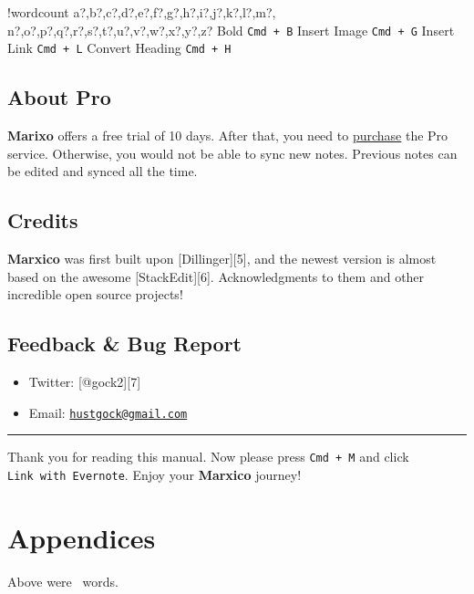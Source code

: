 \documentclass{article}
\providecommand{\tightlist}{%
  \setlength{\itemsep}{0pt}\setlength{\parskip}{0pt}}
\newcounter{words}
\newenvironment{counted}{%
  \setcounter{words}{0}
  \SearchList!{wordcount}{\stepcounter{words}}
    {a?,b?,c?,d?,e?,f?,g?,h?,i?,j?,k?,l?,m?,
    n?,o?,p?,q?,r?,s?,t?,u?,v?,w?,x?,y?,z?}
  \UndoBoundary{'}
  \SearchOrder{p;}}{%
  \StopSearching}
\begin{document}
\begin{counted}
Bold \texttt{Cmd\ +\ B} Insert Image \texttt{Cmd\ +\ G} Insert Link
\texttt{Cmd\ +\ L} Convert Heading \texttt{Cmd\ +\ H}

\subsection{About Pro}\label{about-pro}

\textbf{Marixo} offers a free trial of 10 days. After that, you need to
\href{http://marxi.co/purchase.html}{purchase} the Pro service.
Otherwise, you would not be able to sync new notes. Previous notes can
be edited and synced all the time.

\subsection{Credits}\label{credits}

\textbf{Marxico} was first built upon {[}Dillinger{]}{[}5{]}, and the
newest version is almost based on the awesome {[}StackEdit{]}{[}6{]}.
Acknowledgments to them and other incredible open source projects!

\subsection{Feedback \& Bug Report}\label{feedback-bug-report}

\begin{itemize}
\tightlist
\item
  Twitter: {[}@gock2{]}{[}7{]}
\item
  Email:
  \href{mailto:hustgock@gmail.com}{\nolinkurl{hustgock@gmail.com}}
\end{itemize}

\begin{center}\rule{0.5\linewidth}{\linethickness}\end{center}

Thank you for reading this manual. Now please press \texttt{Cmd\ +\ M}
and click \texttt{Link\ with\ Evernote}. Enjoy your \textbf{Marxico}
journey!

\end{counted} %

\newpage
\section{Appendices}
Above were \thewords\ words. %
\newpage



\nocite{*}
\end{document}
